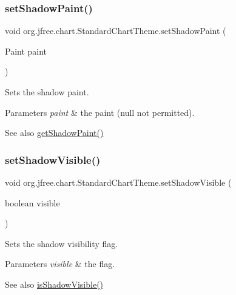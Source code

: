 \subsubsection{\texorpdfstring{set\+Shadow\+Paint()}{setShadowPaint()}}
{\footnotesize\ttfamily void org.\+jfree.\+chart.\+Standard\+Chart\+Theme.\+set\+Shadow\+Paint (\begin{DoxyParamCaption}\item[{Paint}]{paint }\end{DoxyParamCaption})}

Sets the shadow paint.


\begin{DoxyParams}{Parameters}
{\em paint} & the paint ({\ttfamily null} not permitted).\\
\hline
\end{DoxyParams}
\begin{DoxySeeAlso}{See also}
\mbox{\hyperlink{classorg_1_1jfree_1_1chart_1_1_standard_chart_theme_a7401d8e8d0bfe305ff4297a047ccff3b}{get\+Shadow\+Paint()}} 
\end{DoxySeeAlso}
\mbox{\label{classorg_1_1jfree_1_1chart_1_1_standard_chart_theme_a86c2f156c48f6891fac93f6241a6d8ff}} 
\subsubsection{\texorpdfstring{set\+Shadow\+Visible()}{setShadowVisible()}}
{\footnotesize\ttfamily void org.\+jfree.\+chart.\+Standard\+Chart\+Theme.\+set\+Shadow\+Visible (\begin{DoxyParamCaption}\item[{boolean}]{visible }\end{DoxyParamCaption})}

Sets the shadow visibility flag.


\begin{DoxyParams}{Parameters}
{\em visible} & the flag.\\
\hline
\end{DoxyParams}
\begin{DoxySeeAlso}{See also}
\mbox{\hyperlink{classorg_1_1jfree_1_1chart_1_1_standard_chart_theme_a4abce207e347a70e28c6aa7fe3780fe0}{is\+Shadow\+Visible()}} 
\end{DoxySeeAlso}
\mbox{\label{classorg_1_1jfree_1_1chart_1_1_standard_chart_theme_a2ccfadc13b45218fac64a11c83adf070}} 

